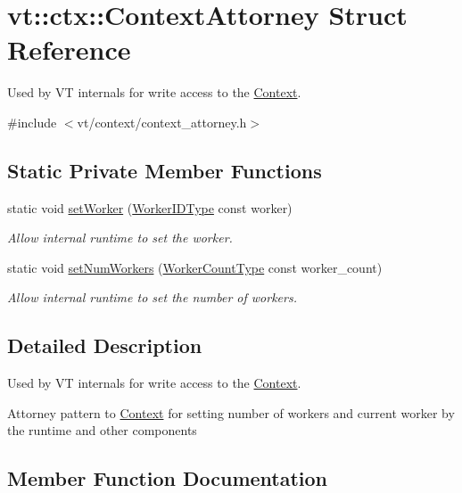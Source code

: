 \hypertarget{structvt_1_1ctx_1_1_context_attorney}{}\section{vt\+:\+:ctx\+:\+:Context\+Attorney Struct Reference}
\label{structvt_1_1ctx_1_1_context_attorney}


Used by VT internals for write access to the \hyperlink{structvt_1_1ctx_1_1_context}{Context}.  




{\ttfamily \#include $<$vt/context/context\+\_\+attorney.\+h$>$}

\subsection*{Static Private Member Functions}
\begin{DoxyCompactItemize}
\item 
static void \hyperlink{structvt_1_1ctx_1_1_context_attorney_aff61a50ec309e8a225504d2f27aa48d4}{set\+Worker} (\hyperlink{namespacevt_a656e362091da17b9b93d0655b36e3392}{Worker\+I\+D\+Type} const worker)
\begin{DoxyCompactList}\small\item\em Allow internal runtime to set the worker. \end{DoxyCompactList}\item 
static void \hyperlink{structvt_1_1ctx_1_1_context_attorney_ab853e0d8039812dfb6b1158f30b39a2a}{set\+Num\+Workers} (\hyperlink{namespacevt_aa93398ea48f2cb6c188512250f7cc248}{Worker\+Count\+Type} const worker\+\_\+count)
\begin{DoxyCompactList}\small\item\em Allow internal runtime to set the number of workers. \end{DoxyCompactList}\end{DoxyCompactItemize}


\subsection{Detailed Description}
Used by VT internals for write access to the \hyperlink{structvt_1_1ctx_1_1_context}{Context}. 

Attorney pattern to \hyperlink{structvt_1_1ctx_1_1_context}{Context} for setting number of workers and current worker by the runtime and other components 

\subsection{Member Function Documentation}
\mbox{\label{structvt_1_1ctx_1_1_context_attorney_ab853e0d8039812dfb6b1158f30b39a2a}} 
